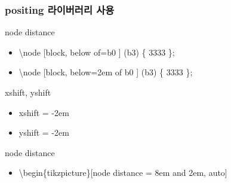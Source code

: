 \documentclass[ aspectratio=169,  12pt,blue,xcolor=pdftex,dvipsnames,table,handout,notes]{beamer}
\begin{document}
		\begin{frame}[t]
		\frametitle{positing 라이버러리 사용}

			\begin{block}{node distance}

			\begin{itemize}
			\item[] 	\textbackslash node [block, below of=b0 ] (b3) \{ 3333 \};
			\item[] 	\textbackslash node [block, below=2em of b0 ] (b3) \{ 3333 \};
			\end{itemize}

			\end{block}

			\begin{block}{xshift, yshift}

			\begin{itemize}
			\item[] 	xshift = -2em
			\item[] 	yshift = -2em
			\end{itemize}

			\end{block}


			\begin{block}{node distance}

			\begin{itemize}
			\item[] 	\textbackslash begin\{tikzpicture\}[node distance = 8em and 2em, auto]
			\end{itemize}

			\end{block}
	

		\end{frame}



\end{document}
